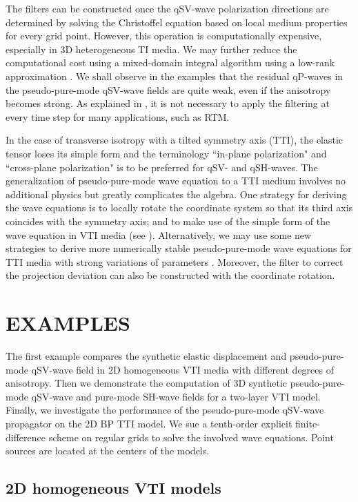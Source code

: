 The filters can be constructed once the qSV-wave polarization directions
are determined by solving the Christoffel equation based on local medium properties for every grid point.
However, this operation is computationally expensive, especially in 3D heterogeneous TI media.
We may further reduce the computational cost using a mixed-domain integral algorithm
using a low-rank approximation \cite[]{cheng.fomel:2014}.
We shall observe in the examples that the residual qP-waves in the pseudo-pure-mode qSV-wave fields
 are quite weak, even if the anisotropy becomes strong.
As explained in \cite{cheng.kang:2014}, it is not necessary to apply the filtering
 at every time step for many applications, such as RTM.

In the case of transverse isotropy with a tilted symmetry axis (TTI), the elastic tensor loses its simple form
and the terminology ``in-plane polarization" and ``cross-plane polarization" is to be preferred for qSV- and qSH-waves.
The generalization of pseudo-pure-mode wave equation to a TTI medium
involves no additional physics but greatly complicates the algebra. One strategy for deriving the wave
 equations is to locally rotate the coordinate system so that its third axis coincides with
 the symmetry axis; and to make use of the simple form of the wave equation in VTI media (see
 \mbox{\cite{cheng.kang:2014}}).
 Alternatively, we may use some new strategies to derive more numerically stable pseudo-pure-mode wave
 equations for TTI media with strong variations of parameters
 \mbox{\cite[]{zhang:2011,bube:2012}}. Moreover, the filter to correct the projection deviation can
also be constructed with the coordinate rotation. 

%
\section{EXAMPLES}

The first example compares the synthetic elastic displacement and pseudo-pure-mode qSV-wave field
in 2D homogeneous VTI media with different degrees of anisotropy.
Then we demonstrate the computation of 3D synthetic pseudo-pure-mode qSV-wave and pure-mode SH-wave fields for a two-layer VTI model.
Finally, we investigate the performance of the pseudo-pure-mode qSV-wave propagator on the 2D BP TTI model.
We sue a tenth-order explicit finite-difference scheme on regular grids to solve the involved wave equations.
Point sources are located at the centers of the models.

\subsection{2D homogeneous VTI models}

